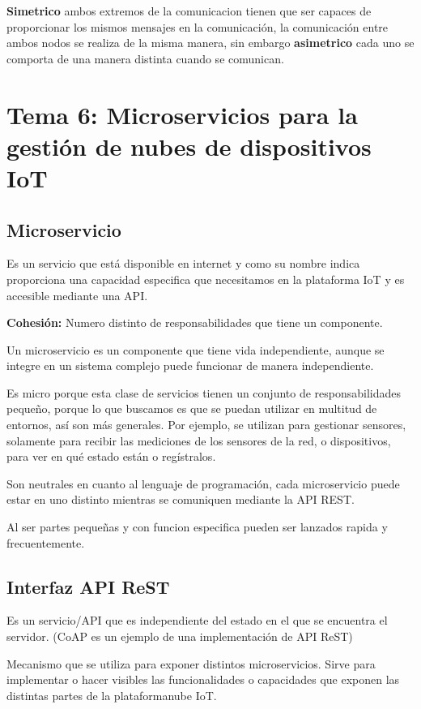\documentclass[12pt]{report} %
\begin{document}
\textbf{Simetrico} ambos extremos de la comunicacion tienen que ser capaces de proporcionar los mismos mensajes en la comunicación, la comunicación entre ambos nodos se realiza de la misma manera, sin embargo \textbf{asimetrico} cada uno se comporta de una manera distinta cuando se comunican. 

\chapter{Tema 6: Microservicios para la gestión de nubes de dispositivos IoT}
\section{Microservicio}
Es un servicio que está disponible en internet y como su nombre indica proporciona una capacidad especifica que necesitamos en la plataforma IoT y es accesible mediante una API.

\textbf{Cohesión:} Numero distinto de responsabilidades que tiene un componente.

Un microservicio es un componente que tiene vida independiente, aunque se integre en un sistema complejo puede funcionar de manera independiente.

Es micro porque esta clase de servicios tienen un conjunto de responsabilidades pequeño, porque lo que buscamos es que se puedan utilizar en multitud de entornos, así son más generales. Por ejemplo, se utilizan para gestionar sensores, solamente para recibir las mediciones de los sensores de la red, o dispositivos, para ver en qué estado están o regístralos.

Son neutrales en cuanto al lenguaje de programación, cada microservicio puede estar en uno distinto mientras se comuniquen mediante la API REST.

Al ser partes pequeñas y con funcion especifica pueden ser lanzados rapida y frecuentemente.

\section{Interfaz API ReST}
Es un servicio/API que es independiente del estado en el que se encuentra el servidor. (CoAP es un ejemplo de una implementación de API ReST)

Mecanismo que se utiliza para exponer distintos microservicios. Sirve para implementar o hacer visibles las funcionalidades o capacidades que exponen las distintas partes de la plataforma\/nube IoT.
\end{document}
